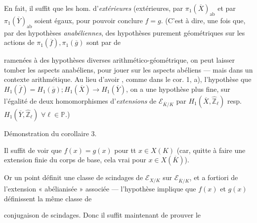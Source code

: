 \documentclass[11pt,a4paper]{article}
\begin{document}
En fait, il suffit \struck{\ill{}} que les hom.  d'\emph{extérieures} (extérieures, par $\pi_1(\overline{X})_{\mathrm{ab}}$ et par $\pi_1(\overline{Y})_{\mathrm{ab}}$ soient égaux, pour pouvoir conclure $f = g$. (C'est à dire, une fois que, par des hypothèses  \emph{anabéliennes}, des hypothèses purement géométriques sur les actions de $\pi_1(\overline{f}), \pi_1(\overline{g})$ sont par de


ramenées à des hypothèses diverses  arithmético-géométrique, on peut laisser tomber les aspects anabéliens, pour jouer  sur les aspects abéliens — mais dans un contexte arithmétique. Au lieu d'avoir  \struck{\ill{}}, comme dans le cor. 1, a), l'hypothèse que $H_1(\overline{f}) = H_1(\overline{g}) ; H_1(\overline{X}) \to H_1(\overline{Y})$, on a une hypothèse plus fine, sur l'égalité de deux homomorphismes d'\emph{extensions} de $\mathcal{E}_{\overline{K}/K}$ par $H_1(\overline{X}, \widehat{\mathbb{Z}}_\ell)$ resp. $H_1(\overline{Y}, \widehat{\mathbb{Z}}_\ell)$ $\forall \ell \in \mathbb{P}$.)

Démonstration du corollaire 3.

Il suffit de voir que $f(x) = g(x)$ pour tt $x \in X(K)$ (car, quitte à faire une extension finie \struck{\ill{}} du corps de base, cela  vrai pour $x \in X(\overline{K})$). 

Or un point définit une classe de   scindages de $\mathcal{E}_{X/K}$ sur $\mathcal{E}_{\overline{K}/K}$, et a fortiori de l'extension « abélianisée » associée — l'hypothèse implique que $f(x)$ et $g(x)$ définissent la même classe de

conjugaison de scindages. Donc il suffit maintenant de prouver le
\end{document}
